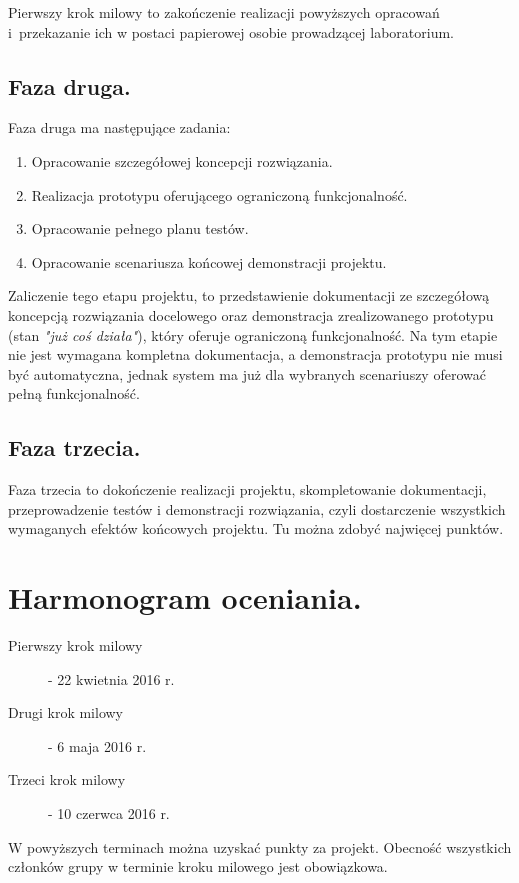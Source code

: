 \documentclass[a4paper,11pt]{article}
\begin{document}
  Pierwszy krok milowy to zakończenie realizacji powyższych opracowań i~przekazanie ich w postaci papierowej osobie prowadzącej laboratorium.

\subsection{Faza druga.}
  Faza druga ma następujące zadania:
  \begin{enumerate}
    \item Opracowanie szczegółowej koncepcji rozwiązania.
    \item Realizacja prototypu oferującego ograniczoną funkcjonalność.
    \item Opracowanie pełnego planu testów.
    \item Opracowanie scenariusza końcowej demonstracji projektu.
  \end{enumerate}
  
  Zaliczenie tego etapu projektu, to przedstawienie dokumentacji ze szczegółową koncepcją rozwiązania docelowego oraz demonstracja zrealizowanego prototypu (stan \textit{"już coś działa"}),
  który oferuje ograniczoną funkcjonalność.
  Na tym etapie nie jest wymagana kompletna dokumentacja, a demonstracja prototypu nie musi być automatyczna, jednak system ma już dla wybranych scenariuszy oferować pełną funkcjonalność.

\subsection{Faza trzecia.}
  Faza trzecia to dokończenie realizacji projektu, skompletowanie dokumentacji, przeprowadzenie testów i demonstracji rozwiązania,
  czyli dostarczenie wszystkich wymaganych efektów końcowych projektu.
  Tu można zdobyć najwięcej punktów.

\section{Harmonogram oceniania.}
  \begin{description}
    \item[Pierwszy krok milowy] - 22 kwietnia 2016 r.
    \item[Drugi krok milowy] - 6 maja 2016 r.
    \item[Trzeci krok milowy] - 10 czerwca 2016 r.
  \end{description}
  
  W powyższych terminach można uzyskać punkty za projekt.
  Obecność wszystkich członków grupy w terminie kroku milowego jest obowiązkowa. 
\end{document}
